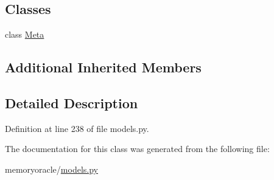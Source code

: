 \subsection*{Classes}
\begin{DoxyCompactItemize}
\item 
class \hyperlink{classmemoryoracle_1_1models_1_1Type_1_1Meta}{Meta}
\end{DoxyCompactItemize}
\subsection*{Additional Inherited Members}


\subsection{Detailed Description}


Definition at line 238 of file models.\+py.



The documentation for this class was generated from the following file\+:\begin{DoxyCompactItemize}
\item 
memoryoracle/\hyperlink{models_8py}{models.\+py}\end{DoxyCompactItemize}
